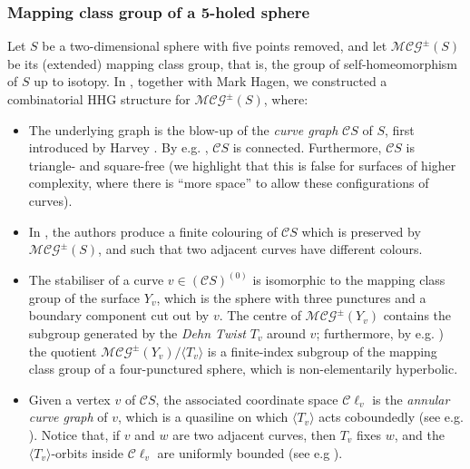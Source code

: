 \documentclass[svgnames]{amsart}
\theoremstyle{plain}
\theoremstyle{definition}
\newcommand{\C}{\mathcal C}
\newcommand{\MCG}{\mathcal{MCG}^\pm}
\begin{document}
\subsubsection{Mapping class group of a 5-holed sphere}\label{subsec:mcg}
Let $S$ be a two-dimensional sphere with five points removed, and let $\MCG(S)$ be its (extended) mapping class group, that is, the group of self-homeomorphism of $S$ up to isotopy. In \cite[Theorem 9.8]{converse}, together with Mark Hagen, we constructed a combinatorial HHG structure for $\MCG(S)$, where:
\begin{itemize}
    \item The underlying graph is the blow-up of the \emph{curve graph} $\C S$ of $S$, first introduced by Harvey \cite{Harvey}. By e.g. \cite[Lemma 2.1]{MM1}, $\C S$ is connected. Furthermore, $\C S$ is triangle- and square-free (we highlight that this is false for surfaces of higher complexity, where there is “more space” to allow these configurations of curves).
    \item In \cite{BBF}, the authors produce a finite colouring of $\C S$ which is preserved by $\MCG(S)$, and such that two adjacent curves have different colours.
    \item The stabiliser of a curve $v\in (\C S)^{(0)}$ is isomorphic to the mapping class group of the surface $Y_v$, which is the sphere with three punctures and a boundary component cut out by $v$. The centre of $\MCG(Y_v)$ contains the subgroup generated by the \emph{Dehn Twist} $T_v$ around $v$; furthermore, by e.g. \cite[Proposition 3.19]{FarbMargalit}) the quotient $\MCG(Y_v)/\langle T_v\rangle$ is a finite-index subgroup of the mapping class group of a four-punctured sphere, which is non-elementarily hyperbolic. 
    \item Given a vertex $v$ of $\C S$, the associated coordinate space $\C\ell_v$ is the \emph{annular curve graph} of $v$, which is a quasiline on which $\langle T_v\rangle $ acts coboundedly (see e.g. \cite[Section 2.4]{MM2}). Notice that, if $v$ and $w$ are two adjacent curves, then $T_v$ fixes $w$, and the $\langle T_v\rangle$-orbits inside $\C\ell_v$ are uniformly bounded (see e.g \cite[Lemma 3.1]{Mousley}).
\end{itemize}
\end{document}
